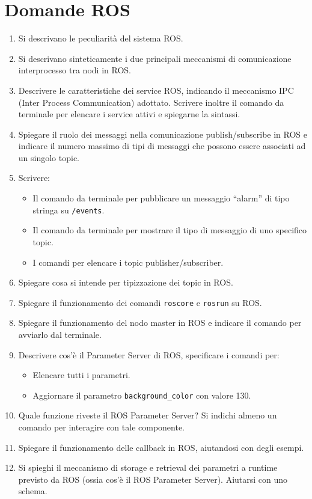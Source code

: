 \documentclass{report}
\begin{document}
\section{Domande ROS}
\begin{enumerate}
    \item Si descrivano le peculiarità del sistema ROS.
    \item Si descrivano sinteticamente i due principali meccanismi di comunicazione interprocesso tra nodi in ROS.
    \item Descrivere le caratteristiche dei service ROS, indicando il meccanismo IPC (Inter Process Communication) adottato. Scrivere inoltre il comando da terminale per elencare i service attivi e spiegarne la sintassi.
    \item Spiegare il ruolo dei messaggi nella comunicazione publish/subscribe in ROS e indicare il numero massimo di tipi di messaggi che possono essere associati ad un singolo topic.
    \item Scrivere:
    \begin{itemize}
        \item Il comando da terminale per pubblicare un messaggio “alarm” di tipo stringa su \texttt{/events}.
        \item Il comando da terminale per mostrare il tipo di messaggio di uno specifico topic.
        \item I comandi per elencare i topic publisher/subscriber.
    \end{itemize}
    \item Spiegare cosa si intende per tipizzazione dei topic in ROS.
    \item Spiegare il funzionamento dei comandi \texttt{roscore} e \texttt{rosrun} su ROS.
    \item Spiegare il funzionamento del nodo master in ROS e indicare il comando per avviarlo dal terminale.
    \item Descrivere cos’è il Parameter Server di ROS, specificare i comandi per:
    \begin{itemize}
        \item Elencare tutti i parametri.
        \item Aggiornare il parametro \texttt{background\_color} con valore 130.
    \end{itemize}
    \item Quale funzione riveste il ROS Parameter Server? Si indichi almeno un comando per interagire con tale componente.
    \item Spiegare il funzionamento delle callback in ROS, aiutandosi con degli esempi.
    \item Si spieghi il meccanismo di storage e retrieval dei parametri a runtime previsto da ROS (ossia cos’è il ROS Parameter Server). Aiutarsi con uno schema.
\end{enumerate}
\end{document}
